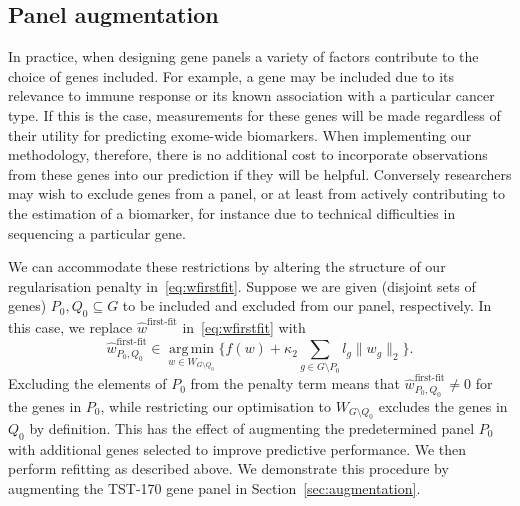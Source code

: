 \documentclass[12pt]{article}
\DeclareMathOperator*{\argmin}{arg\,min}
\begin{document}
\subsection{Panel augmentation \label{sec:panelaugmentation}}
In practice, when designing gene panels a variety of factors contribute to the choice of genes included. For example, a gene may be included due to its relevance to immune response or its known association with a particular cancer type. If this is the case, measurements for these genes will be made regardless of their utility for predicting exome-wide biomarkers. When implementing our methodology, therefore, there is no additional cost to incorporate observations from these genes into our prediction if they will be helpful. Conversely researchers may wish to exclude genes from a panel, or at least from actively contributing to the estimation of a biomarker, for instance due to technical difficulties in sequencing a particular gene. 

We can accommodate these restrictions by altering the structure of our regularisation penalty in~\eqref{eq:wfirstfit}.  Suppose we are given (disjoint sets of genes) $P_0, Q_0 \subseteq G$ to be included and excluded from our panel, respectively. In this case, we replace $\hat{w}^{\text{first-fit}}$ in~\eqref{eq:wfirstfit} with 
\begin{equation} \label{eq:augment}
\hat{w}_{P_0, Q_0}^{\text{first-fit}} \in \argmin\limits_{w \in W_{G \setminus Q_0}} \bigl\{ f(w) + \kappa_2 \sum_{g \in G\setminus P_0} l_g \|w_g\|_2 \bigr\}.  
\end{equation}
Excluding the elements of $P_0$ from the penalty term means that $\hat{w}_{P_0, Q_0}^{\text{first-fit}} \neq 0$ for the genes in $P_0$, while restricting our optimisation to $W_{G \setminus Q_0}$ excludes the genes in $Q_0$ by definition. This has the effect of augmenting the predetermined panel $P_0$ with additional genes selected to improve predictive performance. We then perform refitting as described above. We demonstrate this procedure by augmenting the TST-170 gene panel in Section~\ref{sec:augmentation}.
\end{document}
